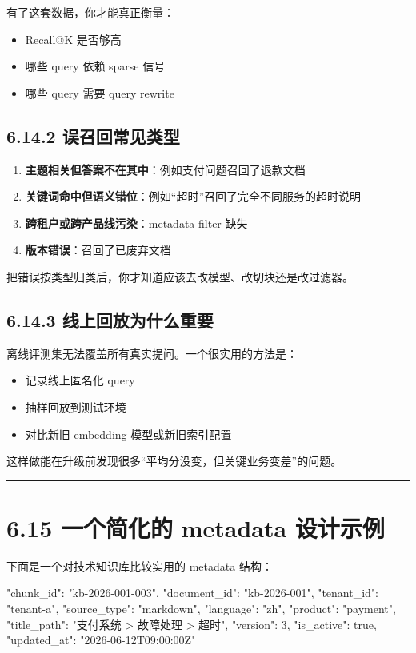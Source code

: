 有了这套数据，你才能真正衡量：


\begin{itemize}[leftmargin=2em]
\item Recall@K 是否够高
\item 哪些 query 依赖 sparse 信号
\item 哪些 query 需要 query rewrite
\end{itemize}

\subsection{6.14.2 误召回常见类型}

\begin{enumerate}[leftmargin=2em]
\item \textbf{主题相关但答案不在其中}：例如支付问题召回了退款文档
\item \textbf{关键词命中但语义错位}：例如``超时''召回了完全不同服务的超时说明
\item \textbf{跨租户或跨产品线污染}：metadata filter 缺失
\item \textbf{版本错误}：召回了已废弃文档
\end{enumerate}

把错误按类型归类后，你才知道应该去改模型、改切块还是改过滤器。


\subsection{6.14.3 线上回放为什么重要}

离线评测集无法覆盖所有真实提问。一个很实用的方法是：


\begin{itemize}[leftmargin=2em]
\item 记录线上匿名化 query
\item 抽样回放到测试环境
\item 对比新旧 embedding 模型或新旧索引配置
\end{itemize}

这样做能在升级前发现很多``平均分没变，但关键业务变差''的问题。


\bigskip\hrule\bigskip

\section{6.15 一个简化的 metadata 设计示例}

下面是一个对技术知识库比较实用的 metadata 结构：


\begin{codeblock}
{
  "chunk_id": "kb-2026-001-003",
  "document_id": "kb-2026-001",
  "tenant_id": "tenant-a",
  "source_type": "markdown",
  "language": "zh",
  "product": "payment",
  "title_path": "支付系统 > 故障处理 > 超时",
  "version": 3,
  "is_active": true,
  "updated_at": "2026-06-12T09:00:00Z"
}
\end{codeblock}

